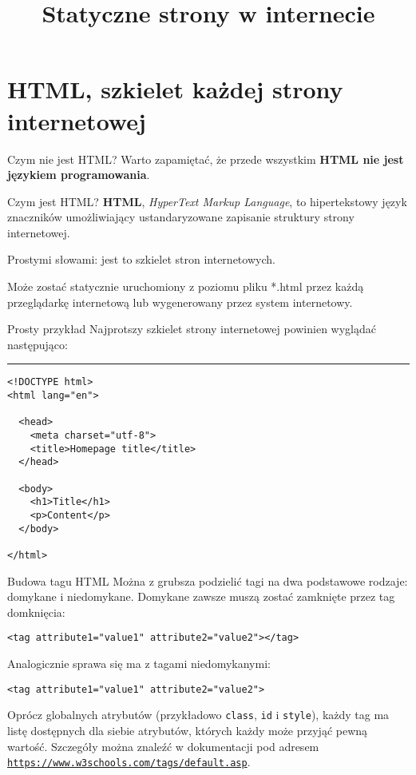 

\title{Statyczne strony w internecie}



\section{HTML, szkielet każdej strony internetowej}

\begin{frame}{Czym nie jest HTML?}
	Warto zapamiętać, że przede wszystkim \textbf{HTML nie jest językiem programowania}.
\end{frame}

\begin{frame}{Czym jest HTML?}
	\textbf{HTML}, \emph{HyperText Markup Language}, to hipertekstowy język znaczników umożliwiający ustandaryzowane zapisanie struktury strony internetowej.
	
	Prostymi słowami: jest to szkielet stron internetowych.
	
	Może zostać statycznie uruchomiony z poziomu pliku *.html przez każdą przeglądarkę internetową lub wygenerowany przez system internetowy.
\end{frame}

\begin{frame}[fragile]{Prosty przykład}
	Najprotszy szkielet strony internetowej powinien wyglądać następująco:
	
	\noindent\rule{2cm}{0.4pt}

	\begin{lstlisting}
<!DOCTYPE html>
<html lang="en">

  <head>
    <meta charset="utf-8">
    <title>Homepage title</title>
  </head>

  <body>
    <h1>Title</h1>
    <p>Content</p>
  </body>

</html>
	\end{lstlisting}
\end{frame}

\begin{frame}[fragile]{Budowa tagu HTML}
	Można z grubsza podzielić tagi na dwa podstawowe rodzaje: domykane i niedomykane. Domykane zawsze muszą zostać zamknięte przez tag domknięcia:
	\begin{lstlisting}
<tag attribute1="value1" attribute2="value2"></tag>
	\end{lstlisting}
	
	Analogicznie sprawa się ma z tagami niedomykanymi:
	
	\begin{lstlisting}
<tag attribute1="value1" attribute2="value2">
	\end{lstlisting}
	
	Oprócz globalnych atrybutów (przykładowo \texttt{class}, \texttt{id} i \texttt{style}), każdy tag ma listę dostępnych dla siebie atrybutów, których każdy może przyjąć pewną wartość. Szczegóły można znaleźć w dokumentacji pod adresem \texttt{\href{https://www.w3schools.com/tags/default.asp}{https://www.w3schools.com/tags/default.asp}}.
\end{frame}

